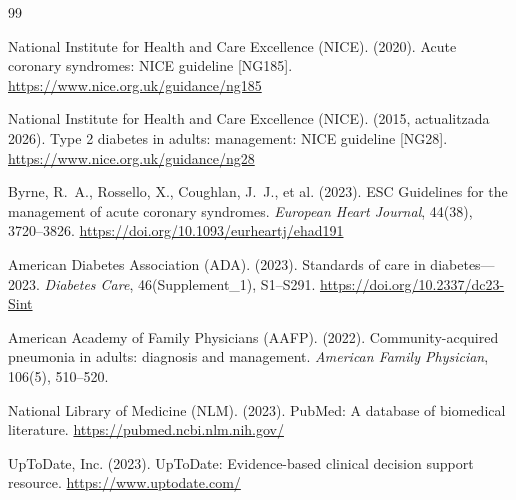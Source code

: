 \documentclass[CAT]{TFUOC}%
\begin{document}
\begin{thebibliography}{99}

National Institute for Health and Care Excellence (NICE). (2020).
\newblock Acute coronary syndromes: NICE guideline [NG185].
\newblock \url{https://www.nice.org.uk/guidance/ng185}

National Institute for Health and Care Excellence (NICE). (2015, actualitzada 2026).
\newblock Type 2 diabetes in adults: management: NICE guideline [NG28].
\newblock \url{https://www.nice.org.uk/guidance/ng28}

Byrne, R.~A., Rossello, X., Coughlan, J.~J., et al. (2023).
 ESC Guidelines for the management of acute coronary syndromes.
\newblock \textit{European Heart Journal}, 44(38), 3720--3826.
\newblock \url{https://doi.org/10.1093/eurheartj/ehad191}

American Diabetes Association (ADA). (2023).
\newblock Standards of care in diabetes---2023.
\newblock \textit{Diabetes Care}, 46(Supplement\_1), S1--S291.
\newblock \url{https://doi.org/10.2337/dc23-Sint}

American Academy of Family Physicians (AAFP). (2022).
\newblock Community-acquired pneumonia in adults: diagnosis and management.
\newblock \textit{American Family Physician}, 106(5), 510--520.

National Library of Medicine (NLM). (2023).
\newblock PubMed: A database of biomedical literature.
\newblock \url{https://pubmed.ncbi.nlm.nih.gov/}

UpToDate, Inc. (2023).
\newblock UpToDate: Evidence-based clinical decision support resource.
\newblock \url{https://www.uptodate.com/}

\end{thebibliography}

\vspace{0.5cm}
\end{document}

